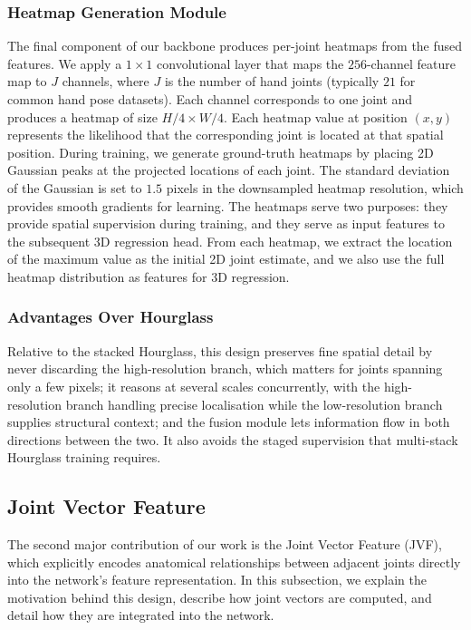 \subsubsection{Heatmap Generation Module}
The final component of our backbone produces per-joint heatmaps from the fused features. We apply a \(1 \times 1\) convolutional layer that maps the \(256\)-channel feature map to \(J\) channels, where \(J\) is the number of hand joints (typically \(21\) for common hand pose datasets). Each channel corresponds to one joint and produces a heatmap of size \(H/4 \times W/4\).
Each heatmap value at position \((x, y)\) represents the likelihood that the corresponding joint is located at that spatial position. During training, we generate ground-truth heatmaps by placing 2D Gaussian peaks at the projected locations of each joint. The standard deviation of the Gaussian is set to \(1.5\) pixels in the downsampled heatmap resolution, which provides smooth gradients for learning.
The heatmaps serve two purposes: they provide spatial supervision during training, and they serve as input features to the subsequent 3D regression head. From each heatmap, we extract the location of the maximum value as the initial 2D joint estimate, and we also use the full heatmap distribution as features for 3D regression.

\subsubsection{Advantages Over Hourglass}
Relative to the stacked Hourglass, this design preserves fine spatial detail by never discarding the high-resolution branch, which matters for joints spanning only a few pixels; it reasons at several scales concurrently, with the high-resolution branch handling precise localisation while the low-resolution branch supplies structural context; and the fusion module lets information flow in both directions between the two. It also avoids the staged supervision that multi-stack Hourglass training requires.

\subsection{Joint Vector Feature}
\label{subsec:jvf}
The second major contribution of our work is the Joint Vector Feature (JVF), which explicitly encodes anatomical relationships between adjacent joints directly into the network's feature representation. In this subsection, we explain the motivation behind this design, describe how joint vectors are computed, and detail how they are integrated into the network.

